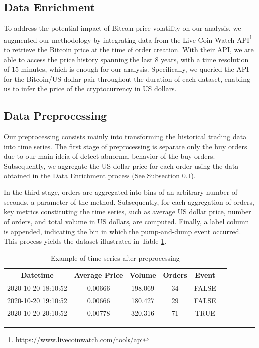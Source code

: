 \documentclass[12pt]{article}
\begin{document}
    \subsection{Data Enrichment}
	\label{subsec_met_enrichment}

    To address the potential impact of Bitcoin price volatility on our analysis, we augmented our methodology by integrating data from the Live Coin Watch API\footnote{\url{https://www.livecoinwatch.com/tools/api}} to retrieve the Bitcoin price at the time of order creation.
    With their API, we are able to access the price history spanning the last 8 years, with a time resolution of 15 minutes, which is enough for our analysis.
    Specifically, we queried the API for the Bitcoin/US dollar pair throughout the duration of each dataset, enabling us to infer the price of the cryptocurrency in US dollars.

    \subsection{Data Preprocessing}
	\label{subsec_met_preprocessing}
	
	Our preprocessing consists mainly into transforming the historical trading data into time series.
    The first stage of preprocessing is separate only the buy orders due to our main ideia of detect abnormal behavior of the buy orders.
    Subsequently, we aggregate the US dollar price for each order using the data obtained in the Data Enrichment process (See Subsection \ref{subsec_met_enrichment}).

    In the third stage, orders are aggregated into bins of an arbitrary number of seconds, a parameter of the method.
    Subsequently, for each aggregation of orders, key metrics constituting the time series, such as average US dollar price, number of orders, and total volume in US dollars, are computed.
    Finally, a label column is appended, indicating the bin in which the pump-and-dump event occurred.
    This process yields the dataset illustrated in Table \ref{tab_timeseries}.

    \begin{table}[!ht]
        \centering
        \caption{Example of time series after preprocessing}
        \begin{tabular}{cccccc}
            \toprule
            \textbf{Datetime} & \textbf{Average Price} & \textbf{Volume} & \textbf{Orders} & \textbf{Event} \\
            \midrule
            2020-10-20 18:10:52 & 0.00666 & 198.069 & 34 & FALSE \\
            2020-10-20 19:10:52 & 0.00666 & 180.427 & 29 & FALSE \\
            2020-10-20 20:10:52 & 0.00778 & 320.316 & 71 & TRUE \\
            \bottomrule
        \end{tabular}
        \label{tab_timeseries}
    \end{table}
\end{document}
